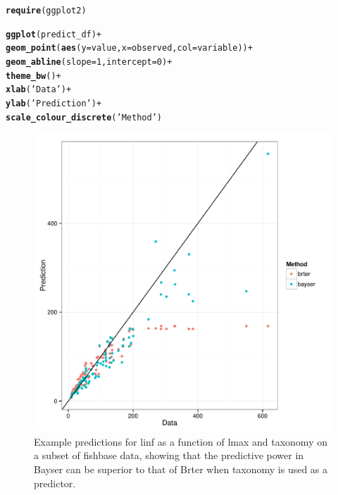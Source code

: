 \documentclass{dragonfly-report}\usepackage[]{graphicx}\usepackage[]{color}
\makeatletter
\def\maxwidth{ %
  \ifdim\Gin@nat@width>\linewidth
    \linewidth
  \else
    \Gin@nat@width
  \fi
}
\newcommand{\hlnum}[1]{\textcolor[rgb]{0.686,0.059,0.569}{#1}}%
\newcommand{\hlstr}[1]{\textcolor[rgb]{0.192,0.494,0.8}{#1}}%
\newcommand{\hlopt}[1]{\textcolor[rgb]{0,0,0}{#1}}%
\newcommand{\hlstd}[1]{\textcolor[rgb]{0.345,0.345,0.345}{#1}}%
\newcommand{\hlkwc}[1]{\textcolor[rgb]{0.333,0.667,0.333}{#1}}%
\newcommand{\hlkwd}[1]{\textcolor[rgb]{0.737,0.353,0.396}{\textbf{#1}}}%
\newenvironment{kframe}{%
 \def\at@end@of@kframe{}%
 \ifinner\ifhmode%
  \def\at@end@of@kframe{\end{minipage}}%
  \begin{minipage}{\columnwidth}%
 \fi\fi%
 \def\FrameCommand##1{\hskip\@totalleftmargin \hskip-\fboxsep
 \colorbox{shadecolor}{##1}\hskip-\fboxsep
     \hskip-\linewidth \hskip-\@totalleftmargin \hskip\columnwidth}%
 \MakeFramed {\advance\hsize-\width
   \@totalleftmargin\z@ \linewidth\hsize
   \@setminipage}}%
 {\par\unskip\endMakeFramed%
 \at@end@of@kframe}
\newenvironment{knitrout}{}{} %
\makeatother
\begin{document}
\begin{knitrout}
\color{fgcolor}\begin{kframe}
\begin{alltt}
\hlkwd{require}\hlstd{(ggplot2)}

\hlkwd{ggplot}\hlstd{(predict_df)} \hlopt{+}
  \hlkwd{geom_point}\hlstd{(}\hlkwd{aes}\hlstd{(}\hlkwc{y} \hlstd{= value,} \hlkwc{x} \hlstd{= observed,} \hlkwc{col} \hlstd{= variable))} \hlopt{+}
  \hlkwd{geom_abline}\hlstd{(}\hlkwc{slope}\hlstd{=}\hlnum{1}\hlstd{,} \hlkwc{intercept}\hlstd{=}\hlnum{0}\hlstd{)} \hlopt{+}
  \hlkwd{theme_bw}\hlstd{()} \hlopt{+}
  \hlkwd{xlab}\hlstd{(}\hlstr{'Data'}\hlstd{)} \hlopt{+}
  \hlkwd{ylab}\hlstd{(}\hlstr{'Prediction'}\hlstd{)} \hlopt{+}
  \hlkwd{scale_colour_discrete}\hlstd{(}\hlstr{'Method'}\hlstd{)}
\end{alltt}
\end{kframe}\begin{figure}
\includegraphics[width=\maxwidth]{figure/unnamed-chunk-2-1} \caption[Example predictions for linf as a function of lmax and taxonomy on a subset of fishbase data, showing that the predictive power in Bayser can be superior to that of Brter when taxonomy is used as a predictor]{Example predictions for linf as a function of lmax and taxonomy on a subset of fishbase data, showing that the predictive power in Bayser can be superior to that of Brter when taxonomy is used as a predictor.\label{fig:unnamed-chunk-2}}
\end{figure}


\end{knitrout}
\end{document}
